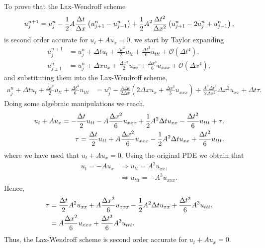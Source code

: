 \begin{questions}

\begin{solution}
To prove that the Lax-Wendroff scheme 
\begin{align*}
u_j^{n+1}=u_j^n-\frac{1}{2} A\frac{\Delta t}{\Delta x}\left(u_{j+1}^n-u_{j-1}^n\right)+\frac{1}{2} A^2\frac{\Delta t^2}{\Delta x^2}\left(u_{j+1}^n-2u_j^n+u_{j-1}^n\right),
\end{align*}
is second order accurate for $u_t+Au_x=0$, we start by Taylor expanding 
\begin{align*}
u^{n+1}_j&=u_j^n+\Delta t u_t+\frac{\Delta t^2}{2} u_{tt}+\frac{\Delta t^3}{6} u_{ttt}+\mathcal{O}(\Delta t^4),\\
u^{n}_{j\pm 1}&=u_j^n\pm\Delta x u_x+\frac{\Delta x^2}{2} u_{xx}\pm\frac{\Delta x^3}{6} u_{xxx}+\mathcal{O}(\Delta x^4),
\end{align*}
and substituting them into the Lax-Wendroff scheme,
\begin{align*}
u_j^n+\Delta t u_t+\frac{\Delta t^2}{2} u_{tt}+\frac{\Delta t^3}{6} u_{ttt}&=u_j^n-\frac{A\Delta t}{2\Delta x}\left(2\Delta x u_x+\frac{\Delta x^3}{3} u_{xxx}\right)+\frac{A^2\Delta t^2}{2\Delta x^2}\Delta x^2 u_{xx}+\Delta t\tau.
\end{align*}
Doing some algebraic manipulations we reach,
\begin{align*}
u_t+Au_x=-\frac{\Delta t}{2} u_{tt}-A\frac{\Delta x^2}{6}u_{xxx}+\frac{1}{2} A^2\Delta t u_{xx}-\frac{\Delta t^2}{6}u_{ttt}+\tau,\\
\tau=\frac{\Delta t}{2} u_{tt}+A\frac{\Delta x^2}{6}u_{xxx}-\frac{1}{2} A^2\Delta t u_{xx}+\frac{\Delta t^2}{6}u_{ttt},\\
\end{align*}
where we have used that $u_t + A u_x = 0$.
Using the original PDE we obtain that
\begin{align*}
u_t=-Au_x&\Rightarrow u_{tt}=A^2u_{xx},\\
&\Rightarrow u_{ttt}=-A^3u_{xxx}.
\end{align*}
Hence,
\begin{align*}
\tau&=\frac{\Delta t}{2} A^2u_{xx}+A\frac{\Delta x^2}{6}u_{xxx}-\frac{1}{2} A^2\Delta t u_{xx}+\frac{\Delta t^2}{6}A^3u_{ttt},\\
&=A\frac{\Delta x^2}{6}u_{xxx}+\frac{\Delta t^2}{6}A^3u_{ttt}.
\end{align*}
Thus, the Lax-Wendroff scheme is second order accurate for $u_t+Au_x=0$.
\end{solution}
\end{questions}
